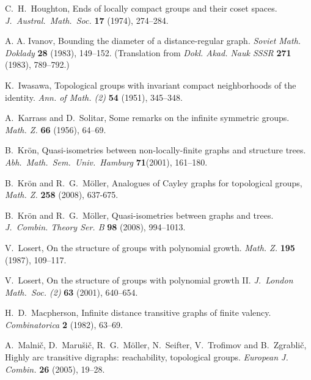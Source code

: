 \documentclass{emsprocart}
\theoremstyle{definition}
\begin{document}
\begin{thebibliography}{99}
 C.\ H.\ Houghton,
                Ends of locally compact groups and their coset spaces.
                {\em J.\ Austral.\ Math.\ Soc.} {\bf 17} (1974), 274--284.

 A. A. Ivanov,
                Bounding the diameter of a distance-regular graph.
                {\em Soviet Math. Doklady} {\bf 28} (1983), 149--152.
                (Translation from {\em Dokl. Akad. Nauk SSSR} {\bf  271} (1983),  789--792.)

 K.~Iwasawa, Topological groups with
                invariant compact neighborhoods of the identity.
                {\em Ann. of Math. (2)} {\bf  54} (1951),  345--348.

 A.~Karrass and D.~Solitar,
                Some remarks on the infinite symmetric groups.
                {\em Math. Z.} {\bf 66} (1956), 64--69.

 B.~Kr\"on,
                Quasi-isometries between non-locally-finite graphs
                and structure trees.
                {\em Abh.\ Math.\ Sem.\ Univ.\ Hamburg} {\bf
                71}(2001), 161--180.

 B.~Kr\"on and R.~G.~M\"oller,
                Analogues of Cayley graphs for topological groups,
                {\em Math. Z.} {\bf 258} (2008), 637-675.

 B.~Kr\"on and R.~G.~M\"oller,
                Quasi-isometries between graphs and trees.
                {\em J.~Combin. Theory Ser. B} {\bf 98} (2008), 994--1013.

  V.~Losert,
             On the structure of groups with polynomial
  growth.
                {\em Math. Z.} {\bf 195} (1987), 109--117.

 V.~Losert,
           On the structure of groups with polynomial growth II.
           {\em J.~London Math.~Soc. (2)} {\bf 63} (2001), 640--654.

 H.\ D.\ Macpherson,
                Infinite distance transitive graphs of finite valency.
                {\em Combinatorica} {\bf 2} (1982), 63--69.

  A.\ Malni\v{c}, D.\ Maru\v{s}i\v{c},
R.~G.~M\"oller, N.\ Seifter, V.\ Trofimov and B.\ Zgrabli\v{c},
Highly arc transitive digraphs: reachability,
  topological groups.  {\it European J. Combin.} {\bf
    26} (2005), 19--28.


\end{thebibliography}
\end{document}
